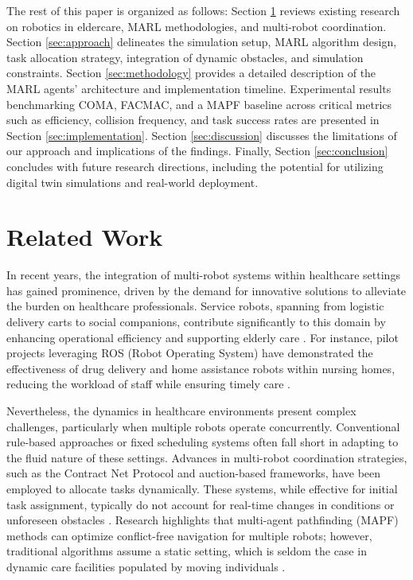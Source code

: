 \documentclass[conference]{IEEEtran}
\begin{document}
The rest of this paper is organized as follows: Section \ref{sec:related} reviews existing research on robotics in eldercare, MARL methodologies, and multi-robot coordination. Section \ref{sec:approach} delineates the simulation setup, MARL algorithm design, task allocation strategy, integration of dynamic obstacles, and simulation constraints. Section \ref{sec:methodology} provides a detailed description of the MARL agents' architecture and implementation timeline. Experimental results benchmarking COMA, FACMAC, and a MAPF baseline across critical metrics such as efficiency, collision frequency, and task success rates are presented in Section \ref{sec:implementation}. Section \ref{sec:discussion} discusses the limitations of our approach and implications of the findings. Finally, Section \ref{sec:conclusion} concludes with future research directions, including the potential for utilizing digital twin simulations and real-world deployment.

\section{Related Work}
\label{sec:related}
In recent years, the integration of multi-robot systems within healthcare settings has gained prominence, driven by the demand for innovative solutions to alleviate the burden on healthcare professionals. Service robots, spanning from logistic delivery carts to social companions, contribute significantly to this domain by enhancing operational efficiency and supporting elderly care \citep{bonaccosi2016}. For instance, pilot projects leveraging ROS (Robot Operating System) have demonstrated the effectiveness of drug delivery and home assistance robots within nursing homes, reducing the workload of staff while ensuring timely care \citep{salinas2023}.

Nevertheless, the dynamics in healthcare environments present complex challenges, particularly when multiple robots operate concurrently. Conventional rule-based approaches or fixed scheduling systems often fall short in adapting to the fluid nature of these settings. Advances in multi-robot coordination strategies, such as the Contract Net Protocol and auction-based frameworks, have been employed to allocate tasks dynamically. These systems, while effective for initial task assignment, typically do not account for real-time changes in conditions or unforeseen obstacles \citep{kayy2017, salinas2023}. Research highlights that multi-agent pathfinding (MAPF) methods can optimize conflict-free navigation for multiple robots; however, traditional algorithms assume a static setting, which is seldom the case in dynamic care facilities populated by moving individuals \citep{sharon2015}.
\end{document}
